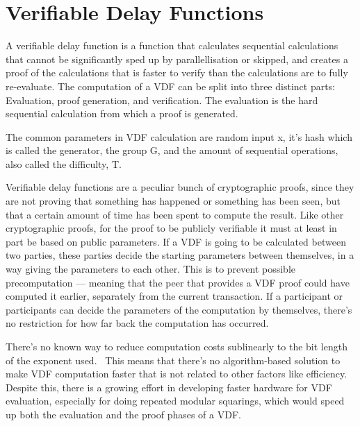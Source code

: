 \section{Verifiable Delay Functions}

A verifiable delay function is a function that calculates sequential calculations that cannot be significantly sped up by parallellisation or skipped, and creates a proof of the calculations that is faster to verify than the calculations are to fully re-evaluate. The computation of a VDF can be split into three distinct parts: Evaluation, proof generation, and verification. The evaluation is the hard sequential calculation from which a proof is generated.  

The common parameters in VDF calculation are random input x, it's hash which is called the generator, the group G, and the amount of sequential operations, also called the difficulty, T.

Verifiable delay functions are a peculiar bunch of cryptographic proofs, since they are not proving that something has happened or something has been seen, but that a certain amount of time has been spent to compute the result. Like other cryptographic proofs, for the proof to be publicly verifiable it must at least in part be based on public parameters. If a VDF is going to be calculated between two parties, these parties decide the starting parameters between themselves, in a way giving the parameters to each other. This is to prevent possible precomputation --- meaning that the peer that provides a VDF proof could have computed it earlier, separately from the current transaction. If a participant or participants can decide the parameters of the computation by themselves, there's no restriction for how far back the computation has occurred.

There's no known way to reduce computation costs sublinearly to the bit length of the exponent used.~\cite{Boneh2018-sm} This means that there's no algorithm-based solution to make VDF computation faster that is not related to other factors like efficiency. Despite this, there is a growing effort in developing faster hardware for VDF evaluation, especially for doing repeated modular squarings, which would speed up both the evaluation and the proof phases of a VDF. 

